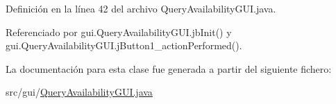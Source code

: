 Definición en la línea 42 del archivo Query\+Availability\+G\+U\+I.\+java.



Referenciado por gui.\+Query\+Availability\+G\+U\+I.\+jb\+Init() y gui.\+Query\+Availability\+G\+U\+I.\+j\+Button1\+\_\+action\+Performed().



La documentación para esta clase fue generada a partir del siguiente fichero\+:\begin{DoxyCompactItemize}
\item 
src/gui/\mbox{\hyperlink{_query_availability_g_u_i_8java}{Query\+Availability\+G\+U\+I.\+java}}\end{DoxyCompactItemize}
